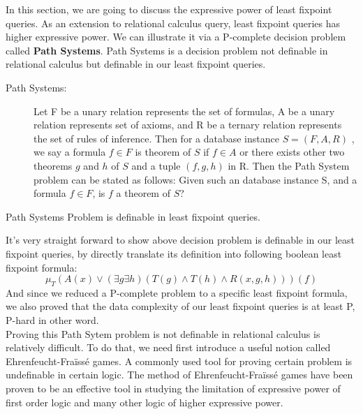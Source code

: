 In this section, we are going to discuss the expressive power of least fixpoint queries. As an extension to relational calculus query, least fixpoint queries has higher expressive power. We can illustrate it via a P-complete decision problem called \textbf{Path Systems}\cite{Cook}. Path Systems is a decision problem not definable in relational calculus but definable in our least fixpoint queries. \\

\begin{description}
\item[Path Systems:]
Let F be a unary relation represents the set of formulas, A be a unary relation represents set of axioms, and R be a ternary relation represents the set of rules of inference. Then for a database instance $S = (F, A, R) $ , we say a formula $f\in F$ is theorem of $S$ if $f\in A$ or there exists other two theorems $g$ and $h $ of $S$ and a tuple $(f, g, h)$ in R. Then the Path System problem can be stated as follows: Given such an database instance S, and a formula $f\in F$, is $f$ a theorem of $S$?\\
\end{description}

\begin{claim}
Path Systems Problem is definable in least fixpoint queries.
\end{claim}

It's very straight forward to show above decision problem is definable in our least fixpoint queries, by directly translate its definition into following boolean least fixpoint formula:
$$ \mu_T(A(x)\lor (\exists g \exists h)(T(g)\land T(h) \land R(x, g, h)))(f) $$
And since we reduced a P-complete problem to a specific least fixpoint formula, we also proved that the data complexity of our least fixpoint queries is at least P, P-hard in other word.\\

Proving this Path Sytem problem is not definable in relational calculus is relatively difficult. To do that, we need first introduce a useful notion called Ehrenfeucht-Fra\"iss\'e games. A commonly used tool for proving certain problem is undefinable in certain logic. The method of Ehrenfeucht-Fra\"iss\'e games have been proven to be an effective tool in studying the limitation of expressive power of first order logic and many other logic of higher expressive power.

